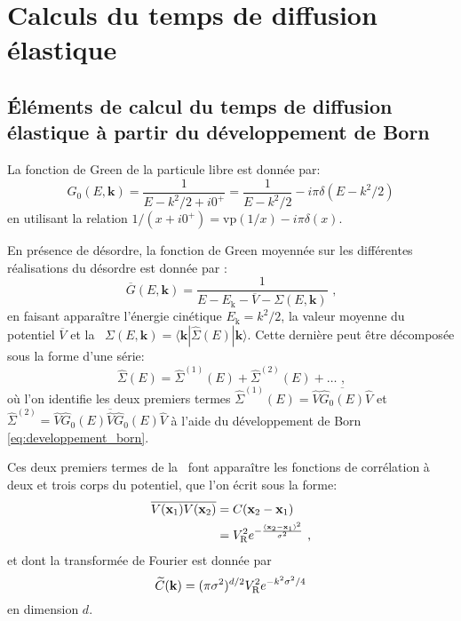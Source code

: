 
\chapter{Calculs du temps de diffusion élastique}
\label{ch:anex_taus}

\section{Éléments de calcul du temps de diffusion élastique à partir du développement de Born}
La fonction de Green de la particule libre est donnée par:
\begin{equation}
G_0(E,\mathbf{k})=\frac{1}{E-k^2/2+i0^+}=\frac{1}{E-k^2/2}-i \pi \delta(E-k^2/2)
\end{equation}
en utilisant la relation $ 1/(x+i0^+)=\mathrm{vp}(1/x)-i\pi \delta(x)$.

En présence de désordre, la fonction de Green moyennée sur les différentes réalisations du désordre est donnée par :
\begin{equation}
\overline{G}(E,\mathbf{k})=\frac{1}{E-E_{\mathrm{k}}-\overline{V}-\Sigma(E,\mathbf{k})} \text{ ,}
\end{equation}
en faisant apparaître l'énergie cinétique $E_{\mathrm{k}}=k^2/2$, la valeur moyenne du potentiel $\overline{V}$ et la \selfenergy\ $\Sigma(E,\mathbf{k})=\langle\mathbf{k}|\hat{\Sigma}(E)|\mathbf{k}\rangle$. Cette dernière peut être décomposée sous la forme d'une série:
\begin{equation}
\hat{\Sigma}(E)=\hat{\Sigma}^{(1)}(E) + \hat{\Sigma}^{(2)}(E) + \dots \text{ ,}
\end{equation}
où l'on identifie les deux premiers termes $\hat{\Sigma}^{(1)}(E)=\overline{\hat{V} \hat{G}_0(E) \hat{V}}$ et $\hat{\Sigma}^{(2)}=\overline{\hat{V} \hat{G}_0(E) \hat{V} \hat{G}_0(E) \hat{V}}$ à l'aide du développement de Born \ref{eq:developpement_born}.

Ces deux premiers termes de la \selfenergy\ font apparaître les fonctions de corrélation à deux et trois corps du potentiel, que l'on écrit sous la forme:
\begin{align}
\overline{V(\mathbf{x}_{\mathrm{1}})V(\mathbf{x}_{\mathrm{2}})}&=C(\mathbf{x}_{\mathrm{2}}-\mathbf{x}_{\mathrm{1}}) \\
&=V_{\mathrm{R}}^2 e^{-\frac{(\mathbf{x}_{\mathrm{2}}-\mathbf{x}_{\mathrm{1}})^2}{\sigma^2}} \text{ ,}
\end{align}
et dont la transformée de Fourier est donnée par
\begin{equation}
\widetilde{C}(\mathbf{k})=(\pi\sigma^2)^{d/2}V_{\mathrm{R}}^2 e^{-k^2\sigma^2/4}
\end{equation}
en dimension $d$.

